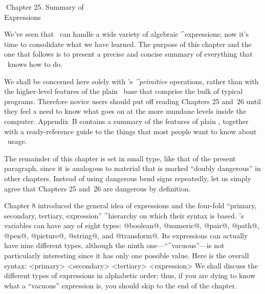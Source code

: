 \eject
\beginChapter Chapter 25. Summary of\\Expressions

We've seen that \MF\ can handle a wide variety of algebraic ^{expressions};
now it's time to consolidate what we have learned. The purpose of this
chapter and the one that follows is to present a precise and concise
summary of everything that \MF\ knows how to do.

We shall be concerned here solely with \MF's {\sl^{primitive}\/} operations,
rather than with the higher-level features of the plain \MF\ base that
comprise the bulk of typical programs. Therefore novice users should put
off reading Chapters 25 and~26 until they feel a need to know what
goes on at the more mundane levels inside the computer. Appendix~B contains
a summary of the features of plain \MF\!, together with a ready-reference guide
to the things that most people want to know about \MF\ usage.

\ninepoint\medskip
The remainder of this chapter is set in small type, like that of the
present paragraph, since it is analogous to material that is marked
``doubly dangerous'' in other chapters. Instead of using dangerous
bend signs repeatedly, let us simply agree that Chapters 25 and~26 are
dangerous by definition.

Chapter 8 introduced the general idea of expressions and the four-fold
``primary, secondary, tertiary, expression'' ^{hierarchy} on which
their syntax is based. \MF's variables can have any of eight types:
@boolean@, @numeric@, @pair@, @path@, @pen@, @picture@, @string@,
and @transform@. Its expressions can actually have nine different
types, although the ninth one---``^{vacuous}''---is not particularly
interesting since it has only one possible value. Here is the overall
syntax:
\beginsyntax
<primary>
 \endgraf\medskip
<secondary>
 \endgraf\medskip
<tertiary>
 \endgraf\medskip
<expression>
\endsyntax
We shall discuss the different types of expressions in alphabetic order;
thus, if you are dying to know what a ``vacuous'' expression is,
you should skip to the end of the chapter. 

